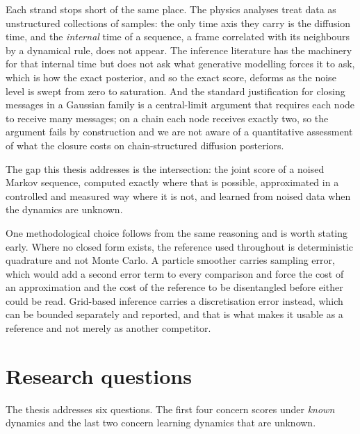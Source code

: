 Each strand stops short of the same place. The physics analyses treat data as
unstructured collections of samples: the only time axis they carry is the
diffusion time, and the \emph{internal} time of a sequence, a frame correlated
with its neighbours by a dynamical rule, does not appear. The inference
literature has the machinery for that internal time but does not ask what
generative modelling forces it to ask, which is how the exact posterior, and
so the exact score, deforms as the noise level is swept from zero to
saturation. And the standard justification for closing messages in a Gaussian
family is a central-limit argument that requires each node to receive many
messages; on a chain each node receives exactly two, so the argument fails by
construction and we are not aware of a quantitative assessment of what the
closure costs on chain-structured diffusion posteriors.

The gap this thesis addresses is the intersection: the joint score of a noised
Markov sequence, computed exactly where that is possible, approximated in a
controlled and measured way where it is not, and learned from noised data when
the dynamics are unknown.

One methodological choice follows from the same reasoning and is worth stating
early. Where no closed form exists, the reference used throughout is
deterministic quadrature and not Monte Carlo. A particle smoother carries
sampling error, which would add a second error term to every comparison and
force the cost of an approximation and the cost of the reference to be
disentangled before either could be read. Grid-based inference carries a
discretisation error instead, which can be bounded separately and reported,
and that is what makes it usable as a reference and not merely as another
competitor.

\section{Research questions}\label{sec:rq}

The thesis addresses six questions. The first four concern scores under
\emph{known} dynamics and the last two concern learning dynamics that are
unknown.

